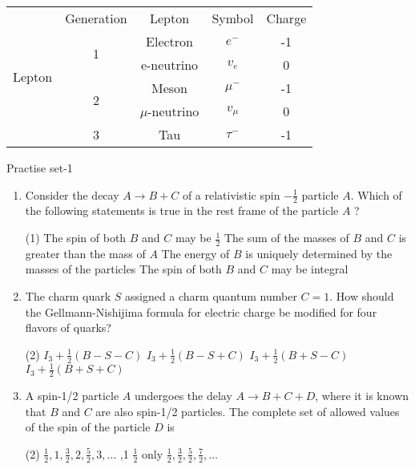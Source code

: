 \begin{tabular}{|c|c|c|c|c|}
	\multirow{6}{*}{Lepton}&Generation&Lepton&Symbol&Charge\\\cline{2-5}
	&\multirow{2}{*}{1}&Electron&$e^-$&-1\\\cline{3-5}
	&&e-neutrino&$v_e$&0\\\cline{2-5}
	&\multirow{2}{*}{2}&Meson&$\mu^-$&-1\\\cline{3-5}
	&&$\mu$-neutrino&$v_\mu$&0\\\cline{2-5}
	&3&Tau&$\tau^-$&-1\\\hline
\end{tabular}
\newpage
\begin{abox}
	Practise set-1
\end{abox}
\begin{enumerate}
	\item  Consider the decay $A \rightarrow B+C$ of a relativistic spin $-\frac{1}{2}$ particle $A$. Which of the following statements is true in the rest frame of the particle $A$ ?
{}	
	 \begin{tasks}(1)
		\task[\textbf{a.}]The spin of both $B$ and $C$ may be $\frac{1}{2}$
		\task[\textbf{b.}]The sum of the masses of $B$ and $C$ is greater than the mass of $A$
		\task[\textbf{c.}]The energy of $B$ is uniquely determined by the masses of the particles
		\task[\textbf{d.}]  The spin of both $B$ and $C$ may be integral
	\end{tasks}
	\item  The charm quark $S$ assigned a charm quantum number $C=1$. How should the Gellmann-Nishijima formula for electric charge be modified for four flavors of quarks?
	{}
	 \begin{tasks}(2)
		\task[\textbf{a.}]$I_3+\frac{1}{2}(B-S-C)$
		\task[\textbf{b.}]$I_3+\frac{1}{2}(B-S+C)$
		\task[\textbf{c.}] $I_3+\frac{1}{2}(B+S-C)$
		\task[\textbf{d.}]$I_3+\frac{1}{2}(B+S+C)$ 
	\end{tasks}
	\item  A spin-1/2 particle $A$ undergoes the delay $A \rightarrow B+C+D$, where it is known that $B$ and $C$ are also spin-1/2 particles. The complete set of allowed values of the spin of the particle $D$ is
	{}
	 \begin{tasks}(2)
		\task[\textbf{a.}]$\frac{1}{2}, 1, \frac{3}{2}, 2, \frac{5}{2}, 3, \ldots$
		,1
		\task[\textbf{c.}]$\frac{1}{2}$ only
		\task[\textbf{d.}]$\frac{1}{2}, \frac{3}{2}, \frac{5}{2}, \frac{7}{2}, \ldots$ 

\end{tasks}
\end{enumerate}
